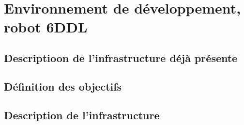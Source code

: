 \chapter{Environnement de développement, robot 6DDL}     %

\section{Descriptioon de l'infrastructure déjà présente}
\section{Définition des objectifs}
\section{Description de l'infrastructure}